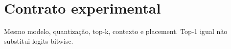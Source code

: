 \section{Contrato experimental}
Mesmo modelo, quantização, top-k, contexto e placement. Top-1 igual não substitui logits bitwise. 
